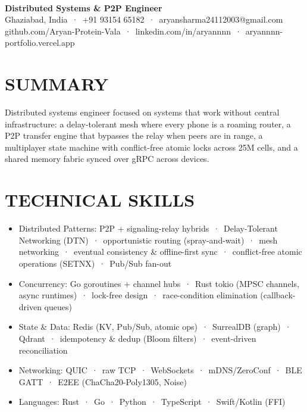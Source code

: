 \documentclass[9pt]{article}
\begin{document}
\\[3pt]
{\large\bfseries Distributed Systems \& P2P Engineer}\\[3pt]
{\small\color{greyc} Ghaziabad, India \,·\, +91 93154 65182 \,·\, aryansharma24112003@gmail.com}\vspace{-2pt}
{\small\color{greyc} github.com/Aryan-Protein-Vala \,·\, linkedin.com/in/aryannnn \,·\, aryannnn-portfolio.vercel.app}\vspace{-2pt}
\section*{SUMMARY}
Distributed systems engineer focused on systems that work without central infrastructure: a delay-tolerant mesh where every phone is a roaming router, a P2P transfer engine that bypasses the relay when peers are in range, a multiplayer state machine with conflict-free atomic locks across 25M cells, and a shared memory fabric synced over gRPC across devices.
\vspace{1pt}
\section*{TECHNICAL SKILLS}
\begin{itemize}[leftmargin=11pt,itemsep=0pt,topsep=1pt,parsep=0pt]
\item Distributed Patterns: P2P + signaling-relay hybrids \,·\, Delay-Tolerant Networking (DTN) \,·\, opportunistic routing (spray-and-wait) \,·\, mesh networking \,·\, eventual consistency \& offline-first sync \,·\, conflict-free atomic operations (SETNX) \,·\, Pub/Sub fan-out
\item Concurrency: Go goroutines + channel hubs \,·\, Rust tokio (MPSC channels, async runtimes) \,·\, lock-free design \,·\, race-condition elimination (callback-driven queues)
\item State \& Data: Redis (KV, Pub/Sub, atomic ops) \,·\, SurrealDB (graph) \,·\, Qdrant \,·\, idempotency \& dedup (Bloom filters) \,·\, event-driven reconciliation
\item Networking: QUIC \,·\, raw TCP \,·\, WebSockets \,·\, mDNS/ZeroConf \,·\, BLE GATT \,·\, E2EE (ChaCha20-Poly1305, Noise)
\item Languages: Rust \,·\, Go \,·\, Python \,·\, TypeScript \,·\, Swift/Kotlin (FFI)
\end{itemize}
\end{document}
